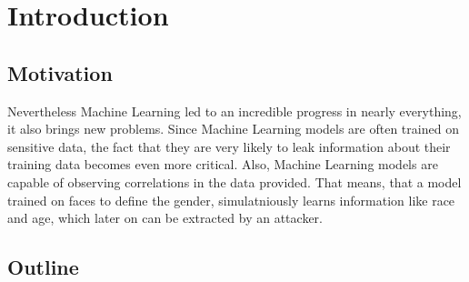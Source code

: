 
\chapter{Introduction}
	\justifying \noindent

	\section{Motivation}
		Nevertheless Machine Learning led to an incredible progress in nearly everything, it also brings new problems. Since Machine Learning models are often trained on sensitive data, the fact that they are very likely to leak information about their training data becomes even more critical. Also, Machine Learning models are capable of observing correlations in the data provided. That means, that a model trained on faces to define the gender, simulatniously learns information like race and age, which later on can be extracted by an attacker.  

	\section{Outline}
